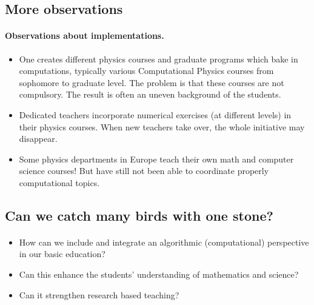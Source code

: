 \documentclass[%
twoside,                 %
final,                   %
10pt]{article}
\begin{document}
\noindent





\subsection{More observations}

\paragraph{Observations about implementations.}

\begin{itemize}
\item One creates different physics courses and graduate programs which bake in computations, typically various Computational Physics courses from sophomore to graduate level.  The problem is that these courses are not compulsory. The result is often an uneven background of the students. 

\item Dedicated teachers incorporate numerical exercises (at different levels) in their physics courses. When new teachers take over, the whole initiative may disappear. 

\item Some  physics departments in Europe teach their own math and computer science courses! But have still not been able to coordinate properly computational topics.
\end{itemize}

\noindent




\subsection{Can we catch many birds with one stone?}

\paragraph{}
\begin{itemize}
\item How can we include and integrate an algorithmic (computational) perspective   in our basic education?

\item Can this enhance the students' understanding of mathematics and science?

\item Can it strengthen research based teaching?
\end{itemize}
\end{document}
